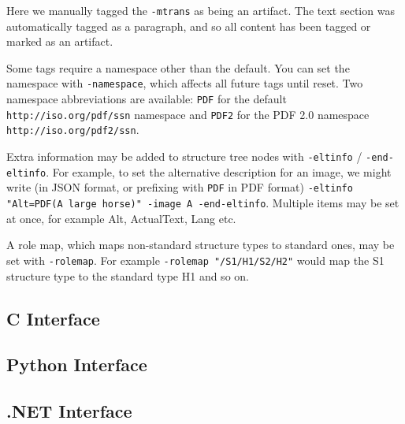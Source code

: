 \documentclass{book}
\begin{document}
\noindent Here we manually tagged the \texttt{-mtrans} as being an artifact. The text section was automatically tagged as a paragraph, and so all content has been tagged or marked as an artifact.

Some tags require a namespace other than the default. You can set the namespace with \texttt{-namespace}, which affects all future tags until reset. Two namespace abbreviations are available: \texttt{PDF} for the default \texttt{http://iso.org/pdf/ssn} namespace and \texttt{PDF2} for the PDF 2.0 namespace \texttt{http://iso.org/pdf2/ssn}.

Extra information may be added to structure tree nodes with \texttt{-eltinfo} / \texttt{-end-eltinfo}. For example, to set the alternative description for an image, we might write (in JSON format, or prefixing with \texttt{PDF} in PDF format) \texttt{-eltinfo "Alt=PDF(A large horse)" -image A -end-eltinfo}. Multiple items may be set at once, for example Alt, ActualText, Lang etc. 

A role map, which maps non-standard structure types to standard ones, may be set with \texttt{-rolemap}. For example \texttt{-rolemap "/S1/H1/S2/H2"} would map the S1 structure type to the standard type H1 and so on.

\begin{cpdflib}
\clearpage
\section*{C Interface}
\begin{small}\tt

\end{small}
\end{cpdflib}

\begin{pycpdflib}
\clearpage
\section*{Python Interface}
\begin{small}\tt

\end{small}
\end{pycpdflib}

\begin{dotnetcpdflib}
\clearpage
\section*{.NET Interface}
\begin{small}\tt

\end{small}
\end{dotnetcpdflib}
\end{document}
